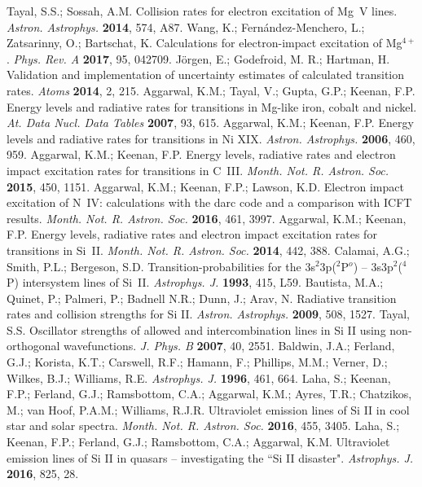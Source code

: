 \documentclass[fleqn]{article}
\begin{document}
\begin{thebibliography}{999}
 Tayal, S.S.; Sossah, A.M. Collision rates for electron excitation of Mg~V lines. {\em Astron. Astrophys.} {\bf 2014}, 574, A87.
 Wang, K.; Fern{\'a}ndez-Menchero, L.; Zatsarinny, O.; Bartschat, K. Calculations for electron-impact excitation of Mg$^{4+}$.  {\em Phys. Rev. A} {\bf 2017}, 95, 042709.
 J\"{o}rgen, E.;   Godefroid, M. R.;   Hartman, H. Validation and implementation of uncertainty estimates of calculated transition rates. {\em Atoms} {\bf 2014}, 2, 215.
 Aggarwal, K.M.; Tayal, V.; Gupta, G.P.; Keenan, F.P.   Energy levels and radiative rates for transitions in Mg-like iron, cobalt and nickel. {\em At. Data Nucl. Data Tables} {\bf 2007},  93, 615.
  Aggarwal, K.M.; Keenan, F.P.  Energy levels and radiative rates for transitions in Ni XIX.  {\em Astron. Astrophys.}  {\bf 2006},  460, 959.
 Aggarwal, K.M.; Keenan, F.P. Energy levels, radiative rates and electron impact excitation rates for transitions in C~III. {\em Month. Not. R. Astron. Soc.}  {\bf 2015}, 450,  1151.
 Aggarwal, K.M.; Keenan, F.P.; Lawson, K.D. Electron impact excitation of N~IV: calculations with the {\sc darc} code and a comparison with ICFT results.  {\em Month. Not. R. Astron. Soc.}  {\bf 2016}, 461,  3997.
 Aggarwal, K.M.; Keenan, F.P.  Energy levels, radiative rates and electron impact excitation rates for transitions in Si~II. {\em Month. Not. R. Astron. Soc.}  {\bf 2014}, 442,  388.
 Calamai, A.G.; Smith, P.L.; Bergeson, S.D. Transition-probabilities for the 3s$^2$3p($^2$P$^o$) --  3s3p$^2$($^4$P) intersystem  lines of Si~II.   {\em Astrophys. J.} {\bf 1993}, 415, L59.
 Bautista, M.A.; Quinet, P.; Palmeri, P.; Badnell N.R.; Dunn, J.; Arav, N. Radiative transition rates and collision strengths for Si II. {\em Astron. Astrophys.} {\bf 2009}, 508, 1527.
 Tayal, S.S.  Oscillator strengths of allowed and intercombination lines in Si II using non-orthogonal wavefunctions.  {\em J. Phys. B} {\bf 2007}, 40, 2551.
 Baldwin, J.A.; Ferland, G.J.; Korista, K.T.; Carswell, R.F.; Hamann, F.; Phillips, M.M.; Verner, D.; Wilkes, B.J.; Williams, R.E.  {\em Astrophys. J.} {\bf 1996}, 461, 664.
 Laha, S.;   Keenan, F.P.;  Ferland, G.J.;  Ramsbottom, C.A.; Aggarwal, K.M.;  Ayres, T.R.;  Chatzikos, M.; van Hoof, P.A.M.;  Williams, R.J.R. Ultraviolet emission lines of Si II in cool star and solar spectra. {\em Month.  Not. R.   Astron. Soc.} {\bf 2016},  455,  3405.
  Laha, S.;  Keenan, F.P.;  Ferland, G.J.;  Ramsbottom, C.A.;  Aggarwal, K.M.  Ultraviolet emission lines of Si II in quasars -- investigating the ``Si II disaster". {\em Astrophys. J.} {\bf 2016},  825,  28.

\end{thebibliography}
\end{document}
